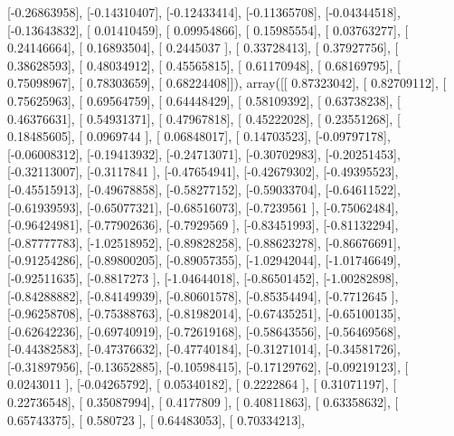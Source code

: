 \documentclass{article}
\begin{document}
       [-0.26863958],
       [-0.14310407],
       [-0.12433414],
       [-0.11365708],
       [-0.04344518],
       [-0.13643832],
       [ 0.01410459],
       [ 0.09954866],
       [ 0.15985554],
       [ 0.03763277],
       [ 0.24146664],
       [ 0.16893504],
       [ 0.2445037 ],
       [ 0.33728413],
       [ 0.37927756],
       [ 0.38628593],
       [ 0.48034912],
       [ 0.45565815],
       [ 0.61170948],
       [ 0.68169795],
       [ 0.75098967],
       [ 0.78303659],
       [ 0.68224408]]), array([[ 0.87323042],
       [ 0.82709112],
       [ 0.75625963],
       [ 0.69564759],
       [ 0.64448429],
       [ 0.58109392],
       [ 0.63738238],
       [ 0.46376631],
       [ 0.54931371],
       [ 0.47967818],
       [ 0.45222028],
       [ 0.23551268],
       [ 0.18485605],
       [ 0.0969744 ],
       [ 0.06848017],
       [ 0.14703523],
       [-0.09797178],
       [-0.06008312],
       [-0.19413932],
       [-0.24713071],
       [-0.30702983],
       [-0.20251453],
       [-0.32113007],
       [-0.3117841 ],
       [-0.47654941],
       [-0.42679302],
       [-0.49395523],
       [-0.45515913],
       [-0.49678858],
       [-0.58277152],
       [-0.59033704],
       [-0.64611522],
       [-0.61939593],
       [-0.65077321],
       [-0.68516073],
       [-0.7239561 ],
       [-0.75062484],
       [-0.96424981],
       [-0.77902636],
       [-0.7929569 ],
       [-0.83451993],
       [-0.81132294],
       [-0.87777783],
       [-1.02518952],
       [-0.89828258],
       [-0.88623278],
       [-0.86676691],
       [-0.91254286],
       [-0.89800205],
       [-0.89057355],
       [-1.02942044],
       [-1.01746649],
       [-0.92511635],
       [-0.8817273 ],
       [-1.04644018],
       [-0.86501452],
       [-1.00282898],
       [-0.84288882],
       [-0.84149939],
       [-0.80601578],
       [-0.85354494],
       [-0.7712645 ],
       [-0.96258708],
       [-0.75388763],
       [-0.81982014],
       [-0.67435251],
       [-0.65100135],
       [-0.62642236],
       [-0.69740919],
       [-0.72619168],
       [-0.58643556],
       [-0.56469568],
       [-0.44382583],
       [-0.47376632],
       [-0.47740184],
       [-0.31271014],
       [-0.34581726],
       [-0.31897956],
       [-0.13652885],
       [-0.10598415],
       [-0.17129762],
       [-0.09219123],
       [ 0.0243011 ],
       [-0.04265792],
       [ 0.05340182],
       [ 0.2222864 ],
       [ 0.31071197],
       [ 0.22736548],
       [ 0.35087994],
       [ 0.4177809 ],
       [ 0.40811863],
       [ 0.63358632],
       [ 0.65743375],
       [ 0.580723  ],
       [ 0.64483053],
       [ 0.70334213],
\end{document}
